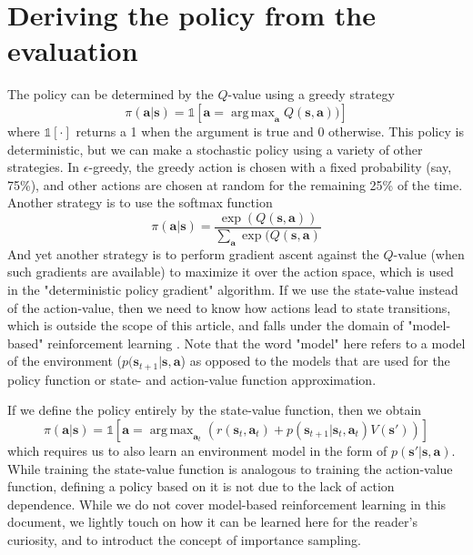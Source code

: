 \documentclass{article}
\DeclareMathOperator*{\argmax}{arg\,max}
\begin{document}
\section{Deriving the policy from the evaluation}
The policy can be determined by the $Q$-value using a greedy strategy
\begin{equation}\label{eq:greedy_policy}
    \pi(\mathbf{a}|\mathbf{s})=\mathbb{1}\left[\mathbf{a}=\argmax_\mathbf{a}Q(\mathbf{s},\mathbf{a}))\right]
\end{equation}where $\mathbb{1}[\cdot]$ returns a 1 when the argument is true and 0 otherwise. This policy is deterministic, but we can make a stochastic policy using a variety of other strategies. In $\epsilon$-greedy, the greedy action is chosen with a fixed probability (say, 75\%), and other actions are chosen at random for the remaining 25\% of the time. Another strategy is to use the softmax function
\begin{equation}
  \pi(\mathbf{a}|\mathbf{s})=\frac{\exp(Q(\mathbf{s},\mathbf{a}))}{\sum_\mathbf{a}\exp(Q(\mathbf{s},\mathbf{a})}
\end{equation}And yet another strategy is to perform gradient ascent against the $Q$-value (when such gradients are available) to maximize it over the action space, which is used in the "deterministic policy gradient" algorithm\cite{DDPG}. If we use the state-value instead of the action-value, then we need to know how actions lead to state transitions, which is outside the scope of this article, and falls under the domain of "model-based" reinforcement learning \cite{model_based_rl_survey}. Note that the word "model" here refers to a model of the environment ($p(\mathbf{s}_{t+1}|\mathbf{s},\mathbf{a}$) as opposed to the models that are used for the policy function or state- and action-value function approximation.

If we define the policy entirely by the state-value function, then we obtain \begin{equation}\pi(\mathbf{a}|\mathbf{s})=\mathbb{1}\left[\mathbf{a}=\argmax_{\mathbf{a}_t}\left(r(\mathbf{s}_t,\mathbf{a}_t)+p(\mathbf{s}_{t+1}|\mathbf{s}_t,\mathbf{a}_t)V(\mathbf{s}')\right)\right]\end{equation}which requires us to also learn an environment model in the form of $p(\mathbf{s}'|\mathbf{s},\mathbf{a})$. While training the state-value function is analogous to training the action-value function, defining a policy based on it is not due to the lack of action dependence. While we do not cover model-based reinforcement learning in this document, we lightly touch on how it can be learned here for the reader's curiosity, and to introduct the concept of importance sampling. 
\end{document}
